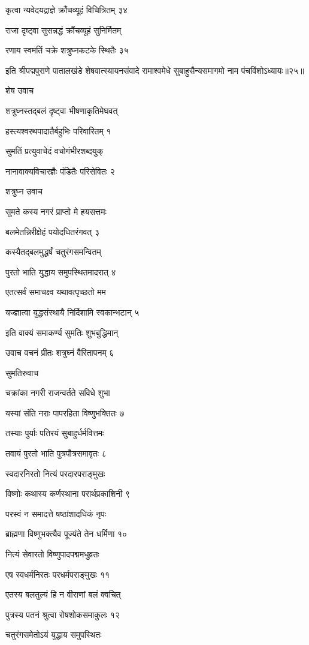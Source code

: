 कृत्वा न्यवेदयद्राज्ञे क्रौंचव्यूहं विचित्रितम् ३४

राजा दृष्ट्वा सुसन्नद्धं क्रौंचव्यूहं सुनिर्मितम्

रणाय स्वमतिं चक्रे शत्रुघ्नकटके स्थितैः ३५

इति श्रीपद्मपुराणे पातालखंडे शेषवात्स्यायनसंवादे रामाश्वमेधे सुबाहुसैन्यसमागमो नाम पंचविंशोऽध्यायः॥२५॥


शेष उवाच

शत्रुघ्नस्तद्बलं दृष्ट्वा भीषणाकृतिमेघवत्

हस्त्यश्वरथपादातैर्बहुभिः परिवारितम् १

सुमतिं प्रत्युवाचेदं वचोगंभीरशब्दयुक्

नानावाक्यविचारज्ञैः पंडितैः परिसेवितः २

शत्रुघ्न उवाच

सुमते कस्य नगरं प्राप्तो मे हयसत्तमः

बलमेतन्निरीक्षेहं पयोदधितरंगवत् ३

कस्यैतद्बलमुद्धर्षं चतुरंगसमन्वितम्

पुरतो भाति युद्धाय समुपस्थितमादरात् ४

एतत्सर्वं समाचक्ष्व यथावत्पृच्छतो मम

यज्ज्ञात्वा युद्धसंस्थायै निर्दिशामि स्वकान्भटान् ५

इति वाक्यं समाकर्ण्य सुमतिः शुभबुद्धिमान्

उवाच वचनं प्रीतः शत्रुघ्नं वैरितापनम् ६

सुमतिरुवाच

चक्रांका नगरी राजन्वर्तते सविधे शुभा

यस्यां संति नराः पापरहिता विष्णुभक्तितः ७

तस्याः पुर्याः पतिरयं सुबाहुर्धर्मवित्तमः

तवायं पुरतो भाति पुत्रपौत्रसमावृतः ८

स्वदारनिरतो नित्यं परदारपराङ्मुखः

विष्णोः कथास्य कर्णस्थाना परार्थप्रकाशिनी ९

परस्वं न समादत्ते षष्ठांशादधिकं नृपः

ब्राह्मणा विष्णुभक्त्यैव पूज्यंते तेन धर्मिणा १०

नित्यं सेवारतो विष्णुपादपद्ममधुव्रतः

एष स्वधर्मनिरतः परधर्मपराङ्मुखः ११

एतस्य बलतुल्यं हि न वीराणां बलं क्वचित्

पुत्रस्य पतनं श्रुत्वा रोषशोकसमाकुलः १२

चतुरंगसमेतोऽयं युद्धाय समुपस्थितः


